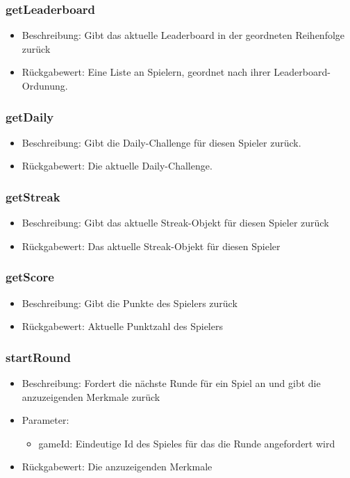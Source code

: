 \documentclass[a4paper]{scrreprt}
\begin{document}
	\subsubsection{getLeaderboard}
	\begin{itemize}
		\item Beschreibung: Gibt das aktuelle Leaderboard in der geordneten Reihenfolge zurück
		\item Rückgabewert: Eine Liste an Spielern, geordnet nach ihrer Leaderboard-Ordunung.
	\end{itemize}
	\subsubsection{getDaily}
	\begin{itemize}
		\item Beschreibung: Gibt die Daily-Challenge für diesen Spieler zurück.
		\item Rückgabewert: Die aktuelle Daily-Challenge.
	\end{itemize}
	\subsubsection{getStreak}
	\begin{itemize}
		\item Beschreibung: Gibt das aktuelle Streak-Objekt für diesen Spieler zurück
		\item Rückgabewert: Das aktuelle Streak-Objekt für diesen Spieler
	\end{itemize}
	\subsubsection{getScore}
	\begin{itemize}
		\item Beschreibung: Gibt die Punkte des Spielers zurück
		\item Rückgabewert: Aktuelle Punktzahl des Spielers
	\end{itemize}
	\subsubsection{startRound}
	\begin{itemize}
		\item Beschreibung: Fordert die nächste Runde für ein Spiel an und gibt die anzuzeigenden Merkmale zurück
		\item Parameter: 
		\begin{itemize}
			\item gameId: Eindeutige Id des Spieles für das die Runde angefordert wird
		\end{itemize}
		\item Rückgabewert: Die anzuzeigenden Merkmale
	\end{itemize}
\end{document}
